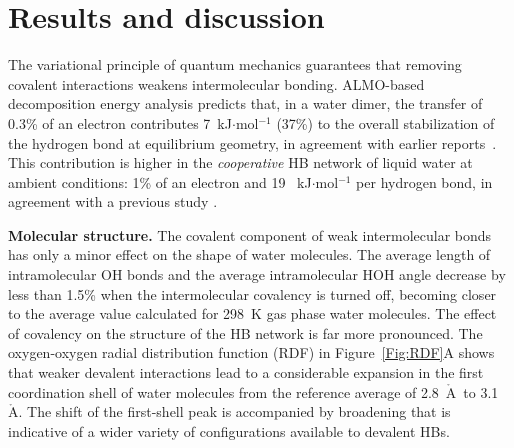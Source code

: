 \documentclass[journal=jacsat,manuscript=article]{achemso}
\newcommand{\Ang}{\ensuremath{\mathring{\text{A}}}}
\begin{document}

\section{Results and discussion}


The variational principle of quantum mechanics guarantees that removing covalent interactions weakens intermolecular bonding. 
ALMO-based decomposition energy analysis predicts that, in a water dimer, the transfer of 0.3\% of an electron contributes  7~kJ$\cdot$mol$^{-1}$ (37\%) to the overall stabilization of the hydrogen bond at equilibrium geometry, in agreement with earlier reports~\cite{stevens1987frozen,chen1996energy,piquemal2005csov,khaliullin2009electron}. This contribution is higher in the \emph{cooperative} HB network of liquid water at ambient conditions: 1\% of an electron and 19 ~kJ$\cdot$mol$^{-1}$ per hydrogen bond, in agreement with a previous study \cite{kuhne2014nature}.

\textbf{Molecular structure.} The covalent component of weak intermolecular bonds has only a minor effect on the shape of water molecules. 
%
The average length of intramolecular OH bonds and the average intramolecular HOH angle decrease by less than 1.5\% when the intermolecular covalency is turned off, becoming closer to the average value calculated for 298~K gas phase water molecules. 
The effect of covalency on the structure of the HB network is far more pronounced. 
The oxygen-oxygen radial distribution function (RDF) in Figure~\ref{Fig:RDF}A shows that weaker devalent interactions lead to a considerable expansion in the first coordination shell of water molecules from the reference average of 2.8~\Ang\ to 3.1~\Ang. 
The shift of the first-shell peak is accompanied by broadening that is indicative of a wider variety of configurations available to devalent HBs.
\end{document}
